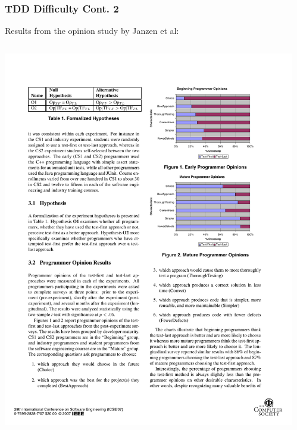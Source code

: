 \documentclass{beamer}
\begin{document}
\begin{frame}
\frametitle{TDD Difficulty Cont. 2}
Results from the opinion study by Janzen et al:
\begin{columns}
\begin{column}{.5\textwidth}
\includegraphics[scale=.75]{janzengraph1.pdf}
\\
\end{column}
\begin{column}{.5\textwidth}

\end{column}
\end{columns}
\end{frame}
\end{document}
